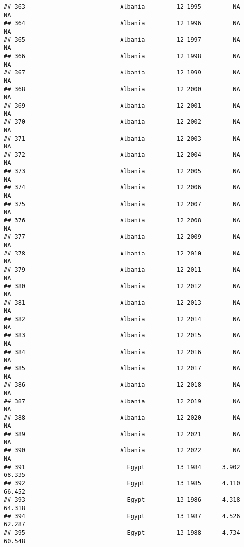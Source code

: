 \documentclass[
]{article}
\begin{document}
\begin{verbatim}
## 363                           Albania         12 1995         NA         NA
## 364                           Albania         12 1996         NA         NA
## 365                           Albania         12 1997         NA         NA
## 366                           Albania         12 1998         NA         NA
## 367                           Albania         12 1999         NA         NA
## 368                           Albania         12 2000         NA         NA
## 369                           Albania         12 2001         NA         NA
## 370                           Albania         12 2002         NA         NA
## 371                           Albania         12 2003         NA         NA
## 372                           Albania         12 2004         NA         NA
## 373                           Albania         12 2005         NA         NA
## 374                           Albania         12 2006         NA         NA
## 375                           Albania         12 2007         NA         NA
## 376                           Albania         12 2008         NA         NA
## 377                           Albania         12 2009         NA         NA
## 378                           Albania         12 2010         NA         NA
## 379                           Albania         12 2011         NA         NA
## 380                           Albania         12 2012         NA         NA
## 381                           Albania         12 2013         NA         NA
## 382                           Albania         12 2014         NA         NA
## 383                           Albania         12 2015         NA         NA
## 384                           Albania         12 2016         NA         NA
## 385                           Albania         12 2017         NA         NA
## 386                           Albania         12 2018         NA         NA
## 387                           Albania         12 2019         NA         NA
## 388                           Albania         12 2020         NA         NA
## 389                           Albania         12 2021         NA         NA
## 390                           Albania         12 2022         NA         NA
## 391                             Egypt         13 1984      3.902     68.335
## 392                             Egypt         13 1985      4.110     66.452
## 393                             Egypt         13 1986      4.318     64.318
## 394                             Egypt         13 1987      4.526     62.287
## 395                             Egypt         13 1988      4.734     60.548

\end{verbatim}
\end{document}

